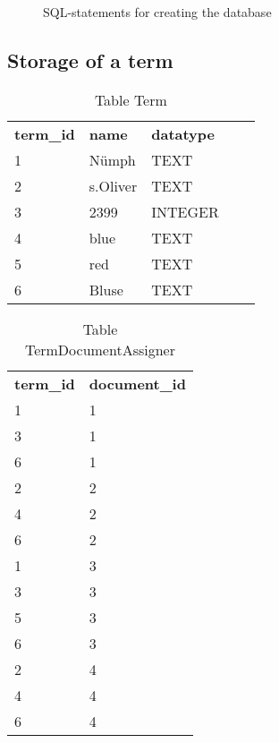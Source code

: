 \begin{figure}[h]
    
    \caption{SQL-statements for creating the database}
\end{figure}

\subsection{Storage of a term}

\begin{table}[h]
    \begin{center}
        \begin{tabular}{ l l l l l }
            \rowcolor{Gray}
            \textbf{term\_id}   & \textbf{name} & \textbf{datatype}\\
            1                   & N\"umph       & TEXT\\
            2                   & s.Oliver      & TEXT\\
            3                   & 2399          & INTEGER\\
            4                   & blue          & TEXT\\
            5                   & red           & TEXT\\
            6                   & Bluse         & TEXT\\
        \end{tabular}
        \caption{Table Term}
    \end{center}
\end{table}

\begin{table}[h]
    \begin{center}
        \begin{tabular}{ l l }
            \rowcolor{Gray}
            \textbf{term\_id}   & \textbf{document\_id}\\
            1                   & 1\\
            3                   & 1\\
            6                   & 1\\
            2                   & 2\\
            4                   & 2\\
            6                   & 2\\
            1                   & 3\\
            3                   & 3\\
            5                   & 3\\
            6                   & 3\\
            2                   & 4\\
            4                   & 4\\
            6                   & 4\\
        \end{tabular}
        \caption{Table TermDocumentAssigner}
    \end{center}
\end{table}



